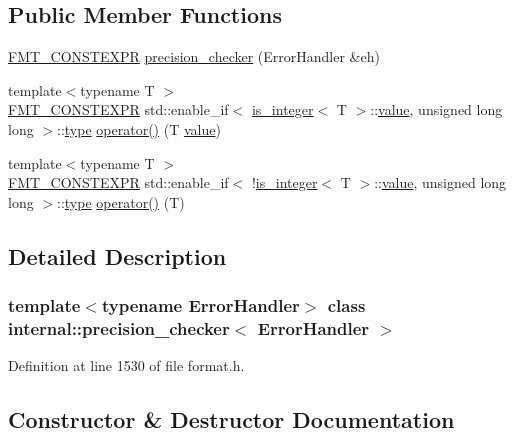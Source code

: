 \subsection*{Public Member Functions}
\begin{DoxyCompactItemize}
\item 
\hyperlink{core_8h_a69201cb276383873487bf68b4ef8b4cd}{F\+M\+T\+\_\+\+C\+O\+N\+S\+T\+E\+X\+PR} \hyperlink{classinternal_1_1precision__checker_ab6e241aa1616650ab931c017e0d43438}{precision\+\_\+checker} (Error\+Handler \&eh)
\item 
{\footnotesize template$<$typename T $>$ }\\\hyperlink{core_8h_a69201cb276383873487bf68b4ef8b4cd}{F\+M\+T\+\_\+\+C\+O\+N\+S\+T\+E\+X\+PR} std\+::enable\+\_\+if$<$ \hyperlink{structinternal_1_1is__integer}{is\+\_\+integer}$<$ T $>$\+::\hyperlink{classinternal_1_1value}{value}, unsigned long long $>$\+::\hyperlink{namespaceinternal_a8661864098ac0acff9a6dd7e66f59038}{type} \hyperlink{classinternal_1_1precision__checker_ad5ac2c580c15344414742fe04bdf33da}{operator()} (T \hyperlink{classinternal_1_1value}{value})
\item 
{\footnotesize template$<$typename T $>$ }\\\hyperlink{core_8h_a69201cb276383873487bf68b4ef8b4cd}{F\+M\+T\+\_\+\+C\+O\+N\+S\+T\+E\+X\+PR} std\+::enable\+\_\+if$<$ !\hyperlink{structinternal_1_1is__integer}{is\+\_\+integer}$<$ T $>$\+::\hyperlink{classinternal_1_1value}{value}, unsigned long long $>$\+::\hyperlink{namespaceinternal_a8661864098ac0acff9a6dd7e66f59038}{type} \hyperlink{classinternal_1_1precision__checker_a20f3c033eed67721857dab0ed30a5102}{operator()} (T)
\end{DoxyCompactItemize}


\subsection{Detailed Description}
\subsubsection*{template$<$typename Error\+Handler$>$\newline
class internal\+::precision\+\_\+checker$<$ Error\+Handler $>$}



Definition at line 1530 of file format.\+h.



\subsection{Constructor \& Destructor Documentation}
\mbox{\label{classinternal_1_1precision__checker_ab6e241aa1616650ab931c017e0d43438}} 
